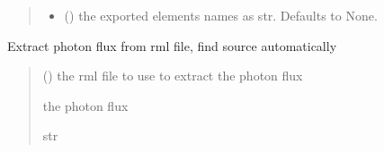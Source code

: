 \documentclass[letterpaper,10pt,english]{sphinxmanual}
\begin{document}
\begin{fulllineitems}
\begin{fulllineitems}
\begin{quote}
\begin{description}
\begin{itemize}
\item {} 
\sphinxAtStartPar
{} (\sphinxstyleliteralemphasis{\sphinxupquote{, }}) \textendash{} the exported elements names as str. Defaults to None.

\end{itemize}

\end{description}\end{quote}

\end{fulllineitems}


\begin{fulllineitems}
\label{\detokenize{code_documentation:raypyng.postprocessing.PostProcess.extract_nrays_from_source}}
\pysigstartsignatures
{}
\pysigstopsignatures
\sphinxAtStartPar
Extract photon flux from rml file, find source automatically
\begin{quote}\begin{description}
\sphinxAtStartPar
{} () \textendash{} the rml file to use to extract the photon flux

\sphinxAtStartPar
the photon flux

\sphinxAtStartPar
str

\end{description}\end{quote}

\end{fulllineitems}



\end{fulllineitems}
\end{document}
